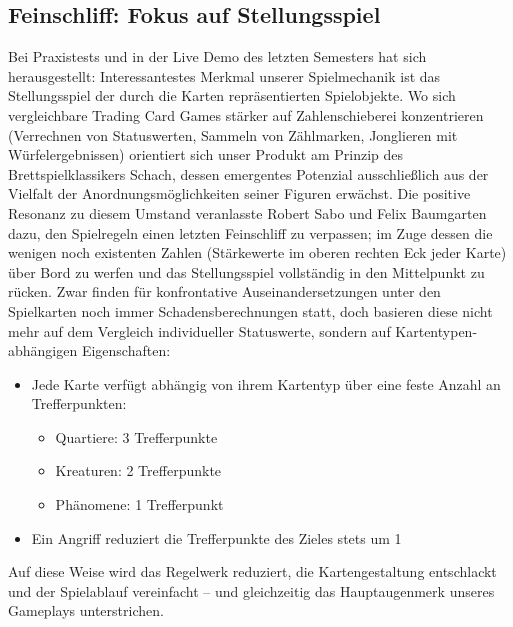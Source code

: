\subsection{Feinschliff: Fokus auf Stellungsspiel}
Bei Praxistests und in der Live Demo des letzten Semesters hat sich herausgestellt: Interessantestes Merkmal unserer Spielmechanik ist das Stellungsspiel der durch die Karten repräsentierten Spielobjekte.
Wo sich vergleichbare Trading Card Games stärker auf Zahlenschieberei konzentrieren (Verrechnen von Statuswerten, Sammeln von Zählmarken, Jonglieren mit Würfelergebnissen) orientiert sich unser Produkt am Prinzip des Brettspielklassikers Schach, dessen emergentes Potenzial ausschließlich aus der Vielfalt der Anordnungsmöglichkeiten seiner Figuren erwächst.
Die positive Resonanz zu diesem Umstand veranlasste Robert Sabo und Felix Baumgarten dazu, den Spielregeln einen letzten Feinschliff zu verpassen; im Zuge dessen die wenigen noch existenten Zahlen (Stärkewerte im oberen rechten Eck jeder Karte) über Bord zu werfen und das Stellungsspiel vollständig in den Mittelpunkt zu rücken. Zwar finden für konfrontative Auseinandersetzungen unter den Spielkarten noch immer Schadensberechnungen statt, doch basieren diese nicht mehr auf dem Vergleich individueller Statuswerte, sondern auf Kartentypen-abhängigen Eigenschaften:
\begin{itemize}
\item Jede Karte verfügt abhängig von ihrem Kartentyp über eine feste Anzahl an Trefferpunkten:
\begin{itemize}
\item Quartiere: 3 Trefferpunkte
\item Kreaturen: 2 Trefferpunkte
\item Phänomene: 1 Trefferpunkt
\end{itemize}
\item Ein Angriff reduziert die Trefferpunkte des Zieles stets um 1
\end{itemize}
Auf diese Weise wird das Regelwerk reduziert, die Kartengestaltung entschlackt und der Spielablauf vereinfacht – und gleichzeitig das Hauptaugenmerk unseres Gameplays unterstrichen.

